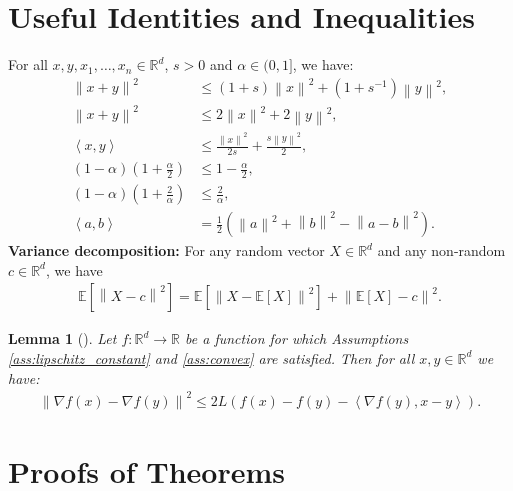 \documentclass{article} %
\newcommand{\norm}[1]{\left\| #1 \right\|}
\newcommand{\inp}[2]{\left\langle#1,#2\right\rangle} %
\newcommand{\R}{\mathbb{R}} %
\newcommand{\Exp}[1]{{\mathbb{E}}\left[#1\right]}
\theoremstyle{plain}
\newtheorem{lemma}[theorem]{Lemma}
\theoremstyle{definition}
\theoremstyle{remark}
\begin{document}
\section{Useful Identities and Inequalities}


For all $x,y,x_1,\ldots,x_n \in \R^d$, $s>0$ and $\alpha\in(0,1]$, we have:
\begin{align}
    \label{eq:young}
    \norm{x+y}^2 &\leq (1+s) \norm{x}^2 + (1+s^{-1}) \norm{y}^2, \\
    \label{eq:young_2}
    \norm{x+y}^2 &\leq 2 \norm{x}^2 + 2 \norm{y}^2, \\
    \label{eq:fenchel}
    \inp{x}{y} &\leq \frac{\norm{x}^2}{2s} + \frac{s\norm{y}^2}{2}, \\
    \label{eq:ineq1}
    \left( 1 - \alpha \right)\left( 1 + \frac{\alpha}{2} \right) &\leq 1 - \frac{\alpha}{2}, \\
    \label{eq:ineq2}
    \left( 1 - \alpha \right)\left( 1 + \frac{2}{\alpha} \right) &\leq \frac{2}{\alpha}, \\
    \label{eq:inp}
    \inp{a}{b} &= \frac{1}{2} \left( \norm{a}^2 + \norm{b}^2 - \norm{a-b}^2 \right).
\end{align}
\textbf{Variance decomposition:} For any random vector $X\in\R^d$ and any non-random $c\in\R^d$, we have
\begin{align}
\label{eq:vardecomp}
   \Exp{\norm{X-c}^2} = \Exp{\norm{X - \Exp{X}}^2} + \norm{\Exp{X}-c}^2.
\end{align}

\begin{lemma}[\cite{nesterov2018lectures}]
   \label{lemma:lipt_func}
   Let $f:\R^d\to \R$ be a function for which Assumptions \ref{ass:lipschitz_constant} and \ref{ass:convex} are satisfied. Then for all $x, y\in\R^d$ we have:
   \begin{align}
       \norm{\nabla f(x) - \nabla f(y)}^2 \leq 2L (f(x) - f(y) - \inp{\nabla f(y)}{x - y}).
   \end{align}
\end{lemma}

\section{Proofs of Theorems}
\end{document}
